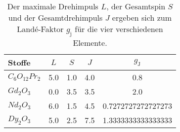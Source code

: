 \begin{table}\caption{Der maximale Drehimpuls $L$, der Gesamtspin $S$ und der Gesamtdrehimpuls $J$ ergeben sich zum Landé-Faktor $g_\text{j}$ für die vier verschiedenen Elemente.}
\label{tab1}
\centering
{}
\begin{tabular}{l S S S S} 
\toprule
{Stoffe} & {$L$} & {$S$} & {$J$} & {$g_\text{J}$}\\
\midrule
$C_6 O_{12} Pr_2$  & 5.0 & 1.0 & 4.0 & 0.8\\
$Gd_2 O_3$         & 0.0 & 3.5 & 3.5 & 2.0\\
$Nd_2 O_3$         & 6.0 & 1.5 & 4.5 & 0.7272727272727273\\
$Dy_2 O_3$         & 5.0 & 2.5 & 7.5 & 1.3333333333333333\\
\bottomrule
\end{tabular}\end{table}
